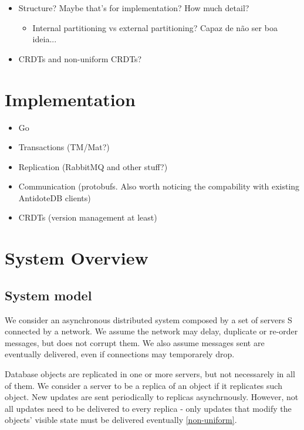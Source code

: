 \documentclass{vldb}
\begin{document}
\begin{itemize}
\item Structure? Maybe that's for implementation? How much detail?
\begin{itemize}
	\item Internal partitioning vs external partitioning? Capaz de não ser boa ideia...	
\end{itemize}
\item CRDTs and non-uniform CRDTs?
\end{itemize}

\section{Implementation}

\begin{itemize}
	\item Go
	\item Transactions (TM/Mat?)
	\item Replication (RabbitMQ and other stuff?)
	\item Communication (protobufs. Also worth noticing the compability with existing AntidoteDB clients)
	\item CRDTs (version management at least)
\end{itemize}

\null\newpage

\section{System Overview}

\subsection{System model}

We consider an asynchronous distributed system composed by a set of servers S connected by a network. We assume the network may delay, duplicate or re-order messages, but does not corrupt them. We also assume messages sent are eventually delivered, even if connections may temporarely drop.

Database objects are replicated in one or more servers, but not necessarely in all of them.  We consider a server to be a replica of an object if it replicates such object. New updates are sent periodically to replicas asynchrnously. However, not all updates need to be delivered to every replica - only updates that modify the objects' visible state must be delivered eventually \ref{non-uniform}. %
\end{document}
